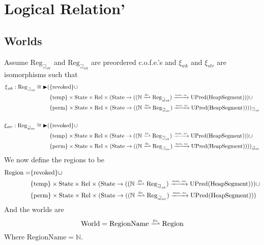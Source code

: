 \documentclass{article}
\newcommand{\finparfun}{\xrightharpoonup{\textit{\tiny{fin}}}}
\newcommand{\monnefun}{\xrightarrow{\textit{\tiny{mon, ne}}}}
\newcommand{\fun}{\rightarrow}
\newcommand{\union}{\mathbin{\cup}}
\newcommand{\blater}{\mathop{\blacktriangleright}}
\newcommand{\cofe}{c.o.f.e.}
\newcommand{\cofes}{\cofe{}'s}
\newcommand{\var}[1]{\mathit{#1}}
\newcommand{\future}{\mathbin{\sqsupseteq}}
\newcommand{\futurewk}{\mathbin{\sqsupseteq}_{\var{wk}}}
\newcommand{\futurestr}{\mathbin{\sqsupseteq}_{\var{str}}}
\newcommand{\plaindom}[1]{\mathrm{#1}}
\newcommand{\HeapSegments}{\plaindom{HeapSegment}}
\newcommand{\nats}{\mathbb{N}}
\newcommand{\Rel}{\plaindom{Rel}}
\newcommand{\States}{\plaindom{State}}
\newcommand{\RegionNames}{\plaindom{RegionName}}
\newcommand{\Regions}{\plaindom{Region}}
\newcommand{\Reg}{\plaindom{Reg}}
\newcommand{\Regwk}{\Reg_{\futurewk}}
\newcommand{\Regstr}{\Reg_{\futurestr}}
\newcommand{\Worlds}{\plaindom{World}}
\newcommand{\UPred}[1]{\plaindom{UPred}(#1)}
\newcommand{\plainview}[1]{\mathrm{#1}}
\newcommand{\perma}{\plainview{perm}}
\newcommand{\temp}{\plainview{temp}}
\newcommand{\revoked}{\plainview{revoked}}
\begin{document}
\section{Logical Relation'}
\subsection{Worlds}
Assume $\Regstr$ and $\Regwk$ are preordered \cofes{} and $\xi_{\var{wk}}$ and $\xi_{\var{str}}$ are isomorphisms such that
\begin{align*}
  \xi_{\var{wk}} :   \Regwk \cong \blater (&\{\revoked\} \union \\
                                           & \{\temp\} \times \States \times \Rel \times (\States \fun ((\nats \finparfun \Regwk) \monnefun \UPred{\HeapSegments})) \union \\
                                           & \{\perma\} \times \States \times \Rel \times (\States \fun ((\nats \finparfun \Regstr) \monnefun \UPred{\HeapSegments})))_{\future_{\var{wk}}} \\ \\
  \xi_{\var{str}} :   \Regstr \cong \blater (&\{\revoked\} \union \\
                                           & \{\temp\} \times \States \times \Rel \times (\States \fun ((\nats \finparfun \Regwk) \monnefun \UPred{\HeapSegments})) \union \\
                                           & \{\perma\} \times \States \times \Rel \times (\States \fun ((\nats \finparfun \Regstr) \monnefun \UPred{\HeapSegments})))_{\future_{\var{str}}}
\end{align*}
We now define the regions to be
\begin{align*}
  \Regions = & \{\revoked\} \union \\
             & \{\temp\} \times \States \times \Rel \times (\States \fun ((\nats \finparfun \Regwk) \monnefun \UPred{\HeapSegments})) \union \\
             & \{\perma\} \times \States \times \Rel \times (\States \fun ((\nats \finparfun \Regstr) \monnefun \UPred{\HeapSegments}))
\end{align*}
And the worlds are
\[
  \Worlds = \RegionNames \finparfun \Regions
\]
Where $\RegionNames = \nats$.
\end{document}
